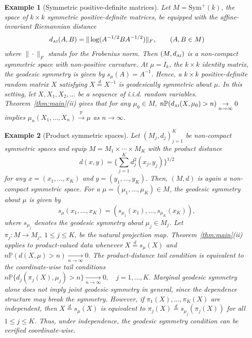 \documentclass[preprint]{imsart}
\theoremstyle{plain}
\newtheorem{example}{Example}
\theoremstyle{remark}
\begin{document}
\begin{example}[Symmetric positive-definite matrices]
Let \(M=\mathrm{Sym}^+(k)\), the space of $k \times k$ symmetric positive-definite matrices, be equipped with the affine-invariant Riemannian distance
\[
d_{\mbox{\tiny AI}}(A,B)=\|\log(A^{-1/2}BA^{-1/2})\|_{F}, \qquad (A,B \in M)
\]
where $\|\cdot\|_{F}$ stands for the Frobenius norm. Then $(M, d_{\mbox{\tiny AI}})$ is a non-compact symmetric space with non-positive curvature. At \(\mu=I_{k}\), the $k \times k$ identity matrix, the geodesic symmetry is given by $s_{\mu}(A)=A^{-1}$. Hence, a $k\times k$ positive-definite random matrix $X$ satisfying $X\stackrel{d}{=}X^{-1}$ is geodesically symmetric about $\mu$. In this setting, let $X, X_1, X_2, \ldots$ be a sequence of i.i.d. random variables. Theorem~\ref{thm:main}(ii) gives that for any $\mu_0 \in M$, $n\mathbb{P}(d_{\mbox{\tiny AI}}(X, \mu_0) > n) \underset{n \to \infty}{\to} 0$ implies $\mu_n(X_1, \ldots, X_n) \overset{\mathbb{P}}{\to} \mu$ as $n\to\infty$. 
\end{example}

\begin{example}[Product symmetric spaces]
Let $(M_j, d_j)_{j=1}^{K}$ be non-compact symmetric spaces and equip $M=M_1\times\cdots\times M_K$ with the product distance $$d(x,y)=\{\sum_{j=1}^K d_j^2(x_j,y_j)\}^{1/2}$$ for any $x=(x_1, \ldots, x_K)$ and $y=(y_1, \ldots, y_K)$. Then, $(M,d)$ is again a non-compact symmetric space. For a $\mu=(\mu_1,\ldots,\mu_K) \in M$, the geodesic symmetry about \(\mu\) is given by
\[
s_\mu(x_1,\ldots,x_K)
=
(s_{\mu_1}(x_1),\ldots,s_{\mu_{K}}(x_K)),
\]
where $s_{\mu_j}$ denotes the geodesic symmetry about $\mu_j \in M_j$. Let $\pi_j:M \to M_j, ~ 1\le j\le K$, be the natural projection map. Theorem~\ref{thm:main}(ii) applies to product-valued data whenever $X\stackrel{d}{=}s_\mu(X)$ and
$n\mathbb P(d(X,\mu)>n)\underset{n\to \infty}{\to} 0.$ The product-distance tail condition is equivalent to the coordinate-wise tail conditions $n\mathbb P\{d_{j}(\pi_{j}(X),\mu_j)>n\} \underset{n\to \infty}{\to} 0, \quad j=1, \ldots, K.$ Marginal geodesic symmetry alone does not imply joint geodesic symmetry in general, since the dependence structure may break the symmetry. However, if $\pi_1(X), \ldots, \pi_K(X)$ are independent, then $X\stackrel{d}{=}s_\mu(X)$ is equivalent to $\pi_j(X)\stackrel{d}{=}s_{\mu_{j}}(\pi_j(X))$ for all $1\le j\le K$. Thus, under independence, the geodesic symmetry condition can be verified coordinate-wise.  
\end{example}
\end{document}
